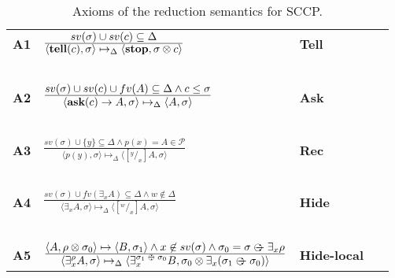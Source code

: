 \documentclass{llncs}
\newcommand{\tell}{{\bf tell}}
\newcommand{\ask}{{\bf ask}}
\newcommand{\ostop}{{\bf stop}}
\def\odiv{\, {\ominus\hspace{-7.7pt} \div} \,}
\begin{document}
\def\odiv{\; {\ominus\hspace{-6pt} \div} \;}
\def\odivvv{\; {\ominus\hspace{-6pt} \div} \;}

\begin{table}  %
   \begin{center}
   \begin{tabular}{llll} 
   \mbox{\bf A1}& $\frac{\displaystyle sv(\sigma) \cup sv(c) \subseteq \Delta } {\displaystyle \langle \hbox{\tell}(c), \sigma \rangle \mapsto_\Delta  \langle \hbox{\ostop},
                                               \sigma \otimes c\rangle}$
   \ \ \ & \bf{Tell}&
  \\ 
  &\mbox{   }&\mbox{   } &\mbox{   }
  \\
  \mbox{\bf A2}& $\frac {\displaystyle sv(\sigma) \cup sv(c) \cup fv(A) \subseteq \Delta \wedge c \leq \sigma}{\displaystyle
  	\begin{array}{l} \langle \hbox{\ask}(c) \rightarrow A, \sigma \rangle \mapsto_\Delta \langle A, \sigma \rangle   	\end{array}}$
    \ \ \ & \bf{Ask}&
    \\
    &\mbox{   }&\mbox{   }&
    \\
  \mbox{\bf A3}& $\frac {\displaystyle sv(\sigma) \cup \{y\} \subseteq \Delta \wedge \displaystyle p(x) = A \in \mathcal{P} }
  {\displaystyle\langle p(y),\sigma\rangle \mapsto_\Delta \langle [^y/_x]A, \sigma \rangle}$ 
  &\bf{Rec}&
    \\
    &\mbox{   }&\mbox{   }&
    \\
    \mbox{\bf A4}& $\frac {\displaystyle sv(\sigma) \cup fv(\exists_x A) \subseteq 
    \Delta \wedge w \not \in \Delta }
    {\displaystyle\langle \exists_x A,\sigma\rangle \mapsto_\Delta \langle [^w/_x]A,
    \sigma\rangle}$
    &\bf{Hide}&
    \\
   &\mbox{   }&\mbox{   }&
  \\
    \mbox{\bf A5}& $\frac {\displaystyle \langle A, \rho \otimes \sigma_0 \rangle
    \mapsto \langle B, \sigma_1 \rangle \wedge x \not \in sv(\sigma) \wedge \sigma_0 
    = \sigma \odiv \exists_x \rho }
    {\displaystyle\langle \exists^{\rho}_x A,\sigma\rangle \mapsto_\Delta \langle 
    \exists^{\sigma_1 \odiv \sigma_0}_x B, \sigma_0 \otimes \exists_x(\sigma_1 \odiv \sigma_0) 
    \rangle}$
    &\bf{Hide-local}&
  \end{tabular}
  \end{center}
\caption{Axioms of the reduction semantics for SCCP.}
\label{fig:operational}
\end{table}
\end{document}
